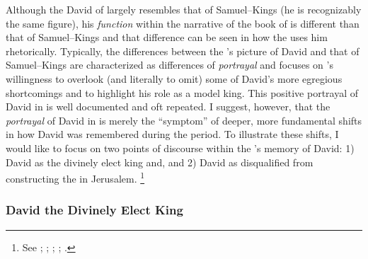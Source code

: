 Although the David of \chronicles largely resembles that of Samuel--Kings (he is recognizably the same figure), his \emph{function} within the narrative of the book of \chronicles is different than that of Samuel--Kings and that difference can be seen in how the \chronicler uses him rhetorically. Typically, the differences between the \chronicler's picture of David and that of Samuel--Kings are characterized as differences of \emph{portrayal} and focuses on \chronicler's willingness to overlook (and literally to omit) some of David's more egregious shortcomings and to highlight his role as a model king. This positive portrayal of David in \chronicles is well documented and oft repeated. I suggest, however, that the \emph{portrayal} of David in \chronicles is merely the ``symptom'' of deeper, more fundamental shifts in how David was remembered during the \secondtemple period. To illustrate these shifts, I would like to focus on two points of discourse within the \chronicler's memory of David: 1) David as the divinely elect king and, and 2) David as disqualified from constructing the \temple in Jerusalem.%
    \footnote{See \cite{jarick_frohlich2019}; \cite[347--383]{japhet2009} \cite{knoppers_biblica1995}; \cite[47--48]{japhet1993}; \cite[44--48]{klein2006}; \cite[80--85]{knoppers2003}.}

\subsubsection{David the Divinely Elect King}

